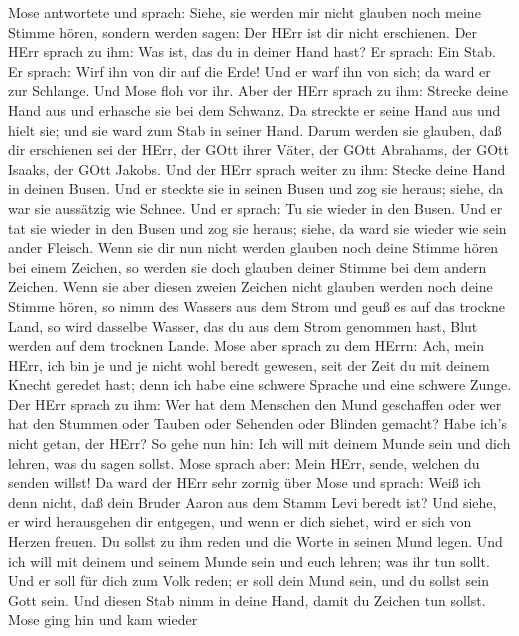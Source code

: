  Mose antwortete und sprach: Siehe, sie werden mir nicht
glauben noch meine Stimme hören, sondern werden sagen: Der HErr ist dir
nicht erschienen.  Der HErr sprach zu ihm: Was ist, das du
in deiner Hand hast? Er sprach: Ein Stab.  Er sprach: Wirf
ihn von dir auf die Erde! Und er warf ihn von sich; da ward er zur
Schlange. Und Mose floh vor ihr.  Aber der HErr sprach zu
ihm: Strecke deine Hand aus und erhasche sie bei dem Schwanz. Da
streckte er seine Hand aus und hielt sie; und sie ward zum Stab in
seiner Hand.  Darum werden sie glauben, daß dir erschienen
sei der HErr, der GOtt ihrer Väter, der GOtt Abrahams, der GOtt Isaaks,
der GOtt Jakobs.  Und der HErr sprach weiter zu ihm: Stecke
deine Hand in deinen Busen. Und er steckte sie in seinen Busen und zog
sie heraus; siehe, da war sie aussätzig wie Schnee.  Und er
sprach: Tu sie wieder in den Busen. Und er tat sie wieder in den Busen
und zog sie heraus; siehe, da ward sie wieder wie sein ander Fleisch.
 Wenn sie dir nun nicht werden glauben noch deine Stimme
hören bei einem Zeichen, so werden sie doch glauben deiner Stimme bei
dem andern Zeichen.  Wenn sie aber diesen zweien Zeichen
nicht glauben werden noch deine Stimme hören, so nimm des Wassers aus
dem Strom und geuß es auf das trockne Land, so wird dasselbe Wasser, das
du aus dem Strom genommen hast, Blut werden auf dem trocknen Lande.
 Mose aber sprach zu dem HErrn: Ach, mein HErr, ich bin je
und je nicht wohl beredt gewesen, seit der Zeit du mit deinem Knecht
geredet hast; denn ich habe eine schwere Sprache und eine schwere Zunge.
 Der HErr sprach zu ihm: Wer hat dem Menschen den Mund
geschaffen oder wer hat den Stummen oder Tauben oder Sehenden oder
Blinden gemacht? Habe ich's nicht getan, der HErr?  So gehe
nun hin: Ich will mit deinem Munde sein und dich lehren, was du sagen
sollst.  Mose sprach aber: Mein HErr, sende, welchen du
senden willst!  Da ward der HErr sehr zornig über Mose und
sprach: Weiß ich denn nicht, daß dein Bruder Aaron aus dem Stamm Levi
beredt ist? Und siehe, er wird herausgehen dir entgegen, und wenn er
dich siehet, wird er sich von Herzen freuen.  Du sollst zu
ihm reden und die Worte in seinen Mund legen. Und ich will mit deinem
und seinem Munde sein und euch lehren; was ihr tun sollt. 
Und er soll für dich zum Volk reden; er soll dein Mund sein, und du
sollst sein Gott sein.  Und diesen Stab nimm in deine Hand,
damit du Zeichen tun sollst.  Mose ging hin und kam wieder
